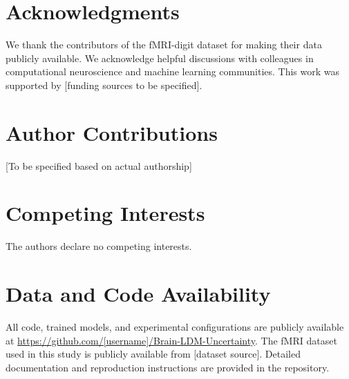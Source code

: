 \section*{Acknowledgments}

We thank the contributors of the fMRI-digit dataset for making their data publicly available. We acknowledge helpful discussions with colleagues in computational neuroscience and machine learning communities. This work was supported by [funding sources to be specified].

\section*{Author Contributions}

[To be specified based on actual authorship]

\section*{Competing Interests}

The authors declare no competing interests.

\section*{Data and Code Availability}

All code, trained models, and experimental configurations are publicly available at \url{https://github.com/[username]/Brain-LDM-Uncertainty}. The fMRI dataset used in this study is publicly available from [dataset source]. Detailed documentation and reproduction instructions are provided in the repository.
